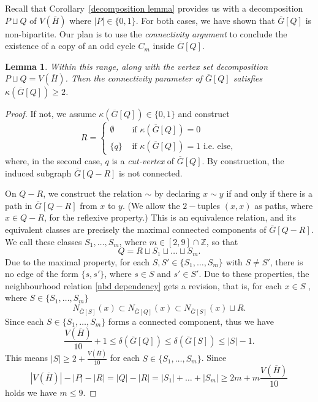 \documentclass[reqno,10pt]{amsart}
\newtheorem{lemma}[theorem]{Lemma}
\theoremstyle{definition}
\begin{document}
Recall that Corollary~\ref{decomposition lemma} provides us with a decomposition $P\sqcup Q$ of $V(\overline{H})$ where $|P|\in\{0,1\}$. For both cases, we have shown that $\overline{G}[Q]$ is non-bipartite. Our plan is to use the \emph{connectivity argument} to conclude the existence of a copy of an odd cycle $C_{m}$ inside $\overline{G}[Q]$. 

\begin{lemma}\label{connectivity-first range}
Within this range, along with the vertex set decomposition $P\sqcup Q=V(\overline{H})$. Then the connectivity parameter of $\overline{G}[Q]$ satisfies $\kappa(\overline{G}[Q])\geq2$.
\end{lemma}
\begin{proof}
If not, we assume $\kappa(\overline{G}[Q])\in\{0,1\}$ and 
construct	
\begin{equation*}
	R=\begin{cases}
		\emptyset &\text{ if } \kappa(\overline{G}[Q])=0\\
		\{q\}&\text{ if } \kappa(\overline{G}[Q])=1\text{ i.e. else},
	\end{cases}
\end{equation*}	
where, in the second case, $q$ is a \emph{cut-vertex} of $\overline{G}[Q]$. By construction, the induced subgraph  $\overline{G}[Q-R]$ is not connected.  

On $Q-R$, we construct the relation $\sim$ by declaring $x\sim y$ if and only if there is a path in $\overline{G}[Q-R]$ from 
$x$ to $y$. (We allow the  $2-$tuples $(x,x)$ as paths, where $x\in Q-R$, for the reflexive property.) This is an equivalence relation, and its equivalent classes are precisely the maximal connected components of $\overline{G}[Q-R]$. We call these classes $S_{1},\ldots,S_{m}$, where $m\in[2,9]\cap\mathbb{Z}$, so that 
\begin{equation*}
Q=R\sqcup S_{1}\sqcup\ldots\sqcup S_{m}.
\end{equation*}
Due to the maximal property, for each  $S,S'\in\{S_{1},\ldots,S_{m}\}$ with $S\neq S'$, there is no edge of the form $\{s,s'\}$, where $s\in S$ and $s'\in S'$. Due to these properties, the neighbourhood relation \eqref{nbd dependency} gets a revision, that is, for each $x\in S$ , where $S\in\{S_{1},\ldots,S_{m}\}$
\begin{equation*}
 N_{\overline{G}[S]}(x)\subset N_{\overline{G}[Q]}(x)\subset N_{\overline{G}[S]}(x)\sqcup R.    
\end{equation*}
Since each $S\in\{S_{1},\ldots,S_{m}\}$ forms a connected component, thus we have 
\begin{equation*}
 \frac{V(\overline{H})}{10}+1\leq\delta(\overline{G}[Q])\leq\delta(\overline{G}[S])\leq|S|-1.   
\end{equation*}
This means $|S|\geq2+\frac{V(\overline{H})}{10}$ for each $S\in\{S_{1},\ldots,S_{m}\}$. Since 
\begin{equation*}
|V(\overline{H})|-|P|-|R|=|Q|-|R|=|S_{1}|+\ldots+|S_{m}|\geq2m+m\frac{V(\overline{H})}{10}    
\end{equation*}
holds we have $m\leq9$. 


\end{proof}
\end{document}
